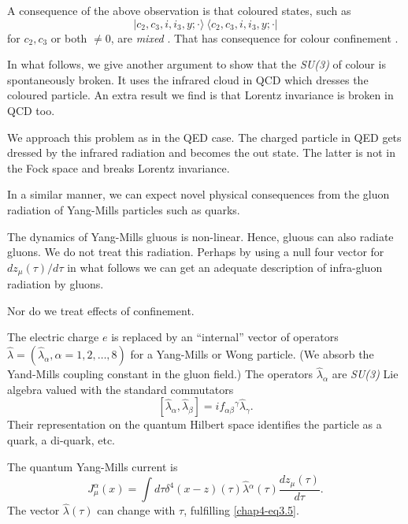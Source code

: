 A consequence of the above observation is that coloured states, such as
\begin{equation}
|c_2, c_3, i, i_3, y; \cdot \rangle ~ \langle c_2, c_3, i, i_3, y; \cdot | \label{chap4-eq3.4}
\end{equation}
for $c_2, c_3$ or both $\neq 0$, are \textit{mixed} \cite{chap4-key4}. That has consequence for colour confinement \cite{chap4-key4}.

In what follows, we give another argument to show that the \textit{SU(3)} of colour is spontaneously broken. It uses the infrared cloud in QCD which dresses the coloured particle. An extra result we find is that Lorentz invariance is broken in QCD too.

We approach this problem as in the QED case. The charged particle in QED gets dressed by the infrared radiation and becomes the out state. The latter is not in the Fock space and breaks Lorentz invariance.

In a similar manner, we can expect novel physical consequences from the gluon radiation of Yang-Mills particles such as quarks.

The dynamics of Yang-Mills gluous is non-linear. Hence, gluous can also radiate gluons. We do not treat this radiation. Perhaps by using a null four vector for $dz_\mu (\tau)/d \tau $ in what follows we can get an adequate description of infra-gluon radiation by gluons.

Nor do we treat effects of confinement.

The electric charge $e$ is replaced by an ``internal'' vector of operators $\hat{\lambda}= (\hat{\lambda}_\alpha, \alpha = 1, 2, \ldots , 8)$ for a Yang-Mills or Wong \cite{chap4-key11} particle. (We absorb the Yand-Mills coupling constant in the gluon field.) The operators $\hat{\lambda}_{\alpha}$ are \textit{SU(3)} Lie algebra valued with the standard commutators
\begin{equation}
\left[ \hat{\lambda}_\alpha, \hat{\lambda}_\beta \right] = if_{\alpha \beta} {}^\gamma \hat{\lambda}_\gamma. \label{chap4-eq3.5}
\end{equation}
Their representation on the quantum Hilbert space identifies the particle as a quark, a di-quark, etc.

The quantum Yang-Mills current is
\begin{equation}
J_\mu^\alpha (x) = \int d \tau \delta^4 (x -z) (\tau) \hat{\lambda} {}^\alpha (\tau) \frac{dz_\mu (\tau)}{d \tau}. \label{chap4-eq3.6}
\end{equation}
The vector $\hat{\lambda} (\tau)$ can change with $\tau$, fulfilling \eqref{chap4-eq3.5}.


